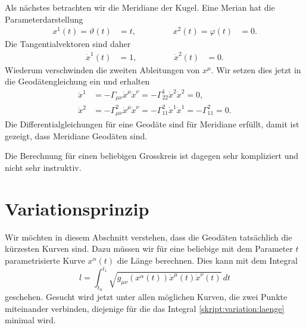 Als nächstes betrachten wir die Meridiane der Kugel.
Eine Merian hat die Parameterdarstellung
\[
\begin{aligned}
x^1(t)=\vartheta(t)&=t,
&\qquad&&
x^2(t)=\varphi(t)&=0.
\end{aligned}
\]
Die Tangentialvektoren sind daher
\[
\begin{aligned}
\dot x^1(t)&=1,
&\qquad&&
\dot x^2(t)&=0.
\end{aligned}
\]
Wiederum verschwinden
die zweiten Ableitungen von $x^\mu$.
Wir setzen dies jetzt in die Geodäten\-gleichung ein und erhalten
\begin{align*}
\ddot x^1
&=
-\Gamma_{\mu\nu}\dot x^\mu \dot x^\nu
=
-\Gamma_{22}^1\dot x^2 \dot x^2
=
0,
\\
\ddot x^2
&=
-\Gamma_{\mu\nu}^2\dot x^\mu \dot x^\nu
=
-\Gamma_{11}^2\dot x^1\dot x^1
=
-\Gamma_{11}^2
=
0.
\end{align*}
Die Differentialgleichungen für eine Geodäte sind für Meridiane erfüllt,
damit ist gezeigt, dass Meridiane Geodäten sind.

Die Berechnung für einen beliebigen Grosskreis ist dagegen sehr 
kompliziert und nicht sehr instruktiv.

\section{Variationsprinzip}
Wir möchten in diesem Abschnitt verstehen, dass die Geodäten tatsächlich 
die kürzesten Kurven sind.
Dazu müssen wir für eine beliebige mit dem Parameter $t$ parametrisierte
Kurve $x^\alpha(t)$ die Länge berechnen.
Dies kann mit dem Integral
\begin{equation}
l=\int_{t_0}^{t_1} \sqrt{g_{\mu\nu}(x^\alpha(t)) \dot x^\mu(t)\dot x^\nu(t)}\,dt
\label{skript:variation:laenge}
\end{equation}
geschehen.
Gesucht wird jetzt unter allen möglichen Kurven, die zwei Punkte miteinander
verbinden, diejenige für die das Integral \eqref{skript:variation:laenge}
minimal wird.

